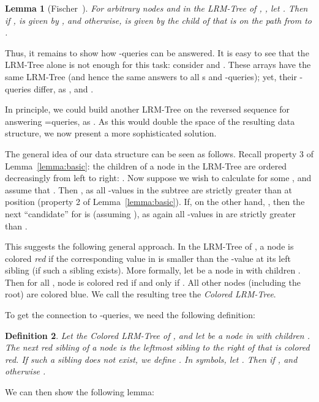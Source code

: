 \documentclass[11pt,onecolumn,final]{article} \usepackage{a4}
\theoremstyle{plain}
\newtheorem{definition}{Definition}
\newtheorem{lemma}[definition]{Lemma}
\theoremstyle{remark}
\begin{document}
\begin{lemma}[Fischer~\cite{fischer10optimal}]
  \label{lemma:rmqlca}
  For arbitrary nodes  and  in the LRM-Tree of , , let . Then if ,  is given by , and otherwise,  is given by the child of  that is on the path from  to .
\end{lemma}

Thus, it remains to show how -queries can be answered. It is easy to see that the LRM-Tree alone is not enough for this task: consider  and . These arrays have the same LRM-Tree (and hence the same answers to all s and -queries); yet, their -queries differ, as , and .

In principle, we could build another LRM-Tree  on the reversed sequence  for answering =queries, as . As this would double the space of the resulting data structure, we now present a more sophisticated solution.

The general idea of our data structure can be seen as follows. Recall property 3 of Lemma~\ref{lemma:basic}: the children  of a node  in the LRM-Tree are ordered decreasingly from left to right: . Now suppose we wish to calculate  for some , and assume that . Then , as all -values in the subtree  are strictly greater than at position  (property 2 of Lemma~\ref{lemma:basic}). If, on the other hand, , then the next ``candidate'' for  is  (assuming ), as again all -values in  are strictly greater than .

This suggests the following general approach. In the LRM-Tree  of , a node is colored \emph{red} if the corresponding value in  is smaller than the -value at its left sibling (if such a sibling exists). More formally, let  be a node in  with children . Then for all , node  is colored red if and only if . All other nodes (including the root) are colored blue. We call the resulting tree the \emph{Colored LRM-Tree}.

To get the connection to -queries, we need the following definition:
\begin{definition}
  \label{def:nrs}
  Let  the Colored LRM-Tree of , and let  be a node in  with children . The \emph{next red sibling}  of a node  is the leftmost sibling to the right of  that is colored red. If such a sibling does not exist, we define . In symbols, let . Then  if , and otherwise .
\end{definition}

We can then show the following lemma:
\end{document}
